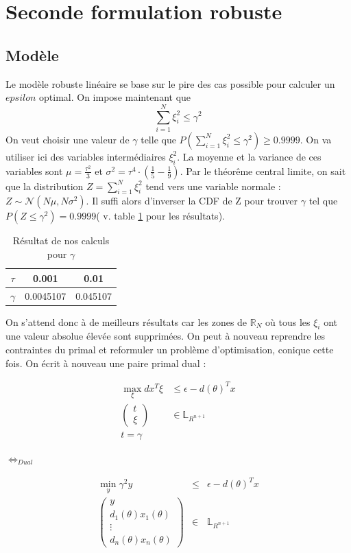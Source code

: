 \section{Seconde formulation robuste}
\subsection{Modèle}
Le modèle robuste linéaire se base sur le pire des cas possible pour calculer un $epsilon$ optimal. On impose maintenant que
$$\sum_{i=1}^N \xi_i^2 \leq \gamma^2$$
On veut choisir une valeur de $\gamma$ telle que $P(\sum_{i=1}^N \xi_i^2 \leq \gamma^2)\geq 0.9999$. On va utiliser ici des variables intermédiaires $\xi_i^2$. La moyenne et la variance de ces variables sont $\mu = \frac{\tau^2}{3}$ et $\sigma^2 = \tau^4\cdot(\frac{1}{5}-\frac{1}{9})$.
Par le théorême central limite, on sait que la distribution $Z = \sum_{i=1}^N \xi_i^2$ tend vers une variable normale : $Z\sim \mathcal{N}(N\mu, N\sigma^2)$. Il suffi alors d'inverser la CDF de Z pour trouver $\gamma$ tel que $P(Z\leq \gamma^2)=0.9999$( v. table \ref{gamma} pour les résultats).
\begin{table}
\centering
\begin{tabular}{|c|c|c|}
\hline
$\tau$ & 0.001 & 0.01 \\
\hline
$\gamma$ & 0.0045107 & 0.045107 \\
\hline
\end{tabular}
\caption{Résultat de nos calculs pour $\gamma$}
\label{gamma}
\end{table}
On s'attend donc à de meilleurs résultats car les zones de $\mathbb{R}_N$ où tous les $\xi_i$ ont une valeur absolue élevée sont supprimées.
On peut à nouveau reprendre les contraintes du primal et reformuler un problème d'optimisation, conique cette fois. On écrit à nouveau une paire primal dual :
\begin{center}
\begin{minipage}{0.4\textwidth}
\begin{align*}
\max_{\xi} dx^T \xi & \leq \epsilon - d(\theta)^Tx \nonumber \\
\begin{pmatrix}t \\ \xi \end{pmatrix} & \in   \mathbb{L}_{R^{n+1}} \nonumber \\ 
t = \gamma \nonumber
\end{align*}
\end{minipage}
$\Leftrightarrow _{Dual}$
\begin{minipage}{0.4\textwidth}
\begin{eqnarray*}
\min_{y} \gamma^2 y & \leq & \epsilon - d(\theta)^Tx \\
\begin{pmatrix}
y \\
d_1(\theta)x_1(\theta) \\
\vdots \\
d_n(\theta)x_n(\theta)
\end{pmatrix}
 & \in & \mathbb{L}_{R^{n+1}}
\end{eqnarray*}
\end{minipage}
\end{center}
